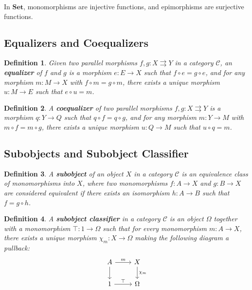 \documentclass{article}
\newtheorem{definition}{Definition}[section]
\begin{document}
In $\mathbf{Set}$, monomorphisms are injective functions, and epimorphisms are surjective functions.

\subsection{Equalizers and Coequalizers}

\begin{definition}
Given two parallel morphisms $f, g \colon X \rightrightarrows Y$ in a category $\mathcal{C}$, an \textbf{equalizer} of $f$ and $g$ is a morphism $e \colon E \to X$ such that $f \circ e = g \circ e$, and for any morphism $m \colon M \to X$ with $f \circ m = g \circ m$, there exists a unique morphism $u \colon M \to E$ such that $e \circ u = m$.
\end{definition}

\begin{definition}
A \textbf{coequalizer} of two parallel morphisms $f, g \colon X \rightrightarrows Y$ is a morphism $q \colon Y \to Q$ such that $q \circ f = q \circ g$, and for any morphism $m \colon Y \to M$ with $m \circ f = m \circ g$, there exists a unique morphism $u \colon Q \to M$ such that $u \circ q = m$.
\end{definition}

\subsection{Subobjects and Subobject Classifier}

\begin{definition}
A \textbf{subobject} of an object $X$ in a category $\mathcal{C}$ is an equivalence class of monomorphisms into $X$, where two monomorphisms $f \colon A \to X$ and $g \colon B \to X$ are considered equivalent if there exists an isomorphism $h \colon A \to B$ such that $f = g \circ h$.
\end{definition}

\begin{definition}
A \textbf{subobject classifier} in a category $\mathcal{C}$ is an object $\Omega$ together with a monomorphism $\top \colon 1 \to \Omega$ such that for every monomorphism $m \colon A \to X$, there exists a unique morphism $\chi_m \colon X \to \Omega$ making the following diagram a pullback:
\[
\begin{tikzcd}
A \arrow[r, "m"] \arrow[d] & X \arrow[d, "\chi_m"] \\
1 \arrow[r, "\top"] & \Omega
\end{tikzcd}
\]
\end{definition}
\end{document}
